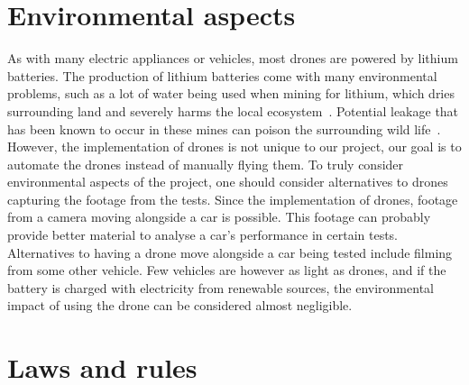 \section{Environmental aspects}
As with many electric appliances or vehicles, most drones are powered by lithium batteries. The production of lithium batteries come with many environmental problems, such as a lot of water being used when mining for lithium, which dries surrounding land and severely harms the local ecosystem~\cite{BauerSophie2020Explainer:Industry}. Potential leakage that has been known to occur in these mines can poison the surrounding wild life~\cite{AmitKatwala2018TheAddiction}. However, the implementation of drones is not unique to our project, our goal is to automate the drones instead of manually flying them. To truly consider environmental aspects of the project, one should consider alternatives to drones capturing the footage from the tests. Since the implementation of drones, footage from a camera moving alongside a car is possible. This footage can probably provide better material to analyse a car's performance in certain tests. Alternatives to having a drone move alongside a car being tested include filming from some other vehicle. Few vehicles are however as light as drones, and if the battery is charged with electricity from renewable sources, the environmental impact of using the drone can be considered almost negligible. 


\section{Laws and rules}
